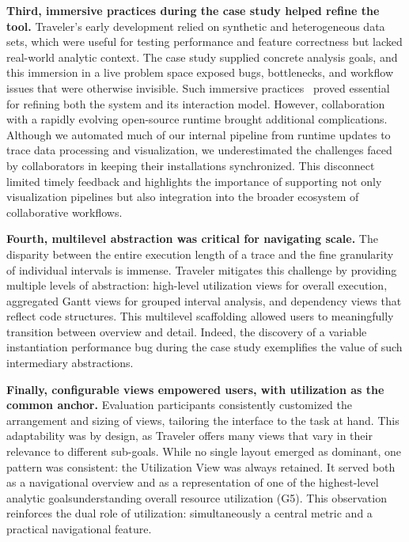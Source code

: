 \begin{refsection}
\textbf{Third, immersive practices during the case study helped refine the tool.} Traveler's early development relied on synthetic and heterogeneous data sets, which were useful for testing performance and feature correctness but lacked real-world analytic context. The case study supplied concrete analysis goals, and this immersion in a live problem space exposed bugs, bottlenecks, and workflow issues that were otherwise invisible. Such immersive practices~\cite{Hall2019} proved essential for refining both the system and its interaction model. However, collaboration with a rapidly evolving open-source runtime brought additional complications. Although we automated much of our internal pipeline from runtime updates to trace data processing and visualization, we underestimated the challenges faced by collaborators in keeping their installations synchronized. This disconnect limited timely feedback and highlights the importance of supporting not only visualization pipelines but also integration into the broader ecosystem of collaborative workflows.

\textbf{Fourth, multilevel abstraction was critical for navigating scale.} The disparity between the entire execution length of a trace and the fine granularity of individual intervals is immense. Traveler mitigates this challenge by providing multiple levels of abstraction: high-level utilization views for overall execution, aggregated Gantt views for grouped interval analysis, and dependency views that reflect code structures. This multilevel scaffolding allowed users to meaningfully transition between overview and detail. Indeed, the discovery of a variable instantiation performance bug during the case study exemplifies the value of such intermediary abstractions.

\textbf{Finally, configurable views empowered users, with utilization as the common anchor.} Evaluation participants consistently customized the arrangement and sizing of views, tailoring the interface to the task at hand. This adaptability was by design, as Traveler offers many views that vary in their relevance to different sub-goals. While no single layout emerged as dominant, one pattern was consistent: the Utilization View was always retained. It served both as a navigational overview and as a representation of one of the highest-level analytic goals\textemdash understanding overall resource utilization (G5). This observation reinforces the dual role of utilization: simultaneously a central metric and a practical navigational feature.


\end{refsection}
